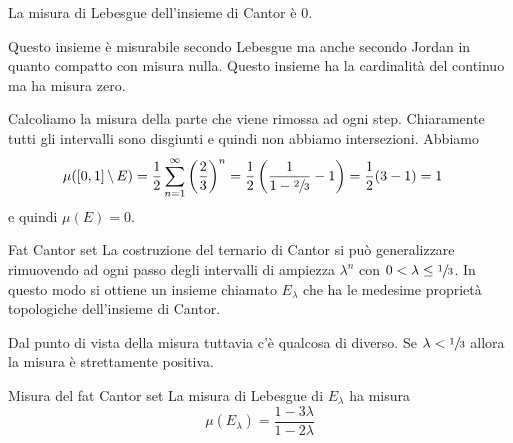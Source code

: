 \documentclass[a4paper]{article}
\begin{document}
\begin{radioactive}
\begin{snippetproposition}{}
    La misura di Lebesgue dell'insieme di Cantor è \(0\).
\end{snippetproposition}
\end{radioactive}

\begin{radioactive}
Questo insieme è misurabile secondo Lebesgue ma anche secondo Jordan in quanto compatto
con misura nulla. Questo insieme ha la cardinalità del continuo ma ha misura zero.
\end{radioactive}

\begin{radioactive}
\begin{snippetproof}{}
    Calcoliamo la misura della parte che viene rimossa ad ogni step.
    Chiaramente tutti gli intervalli sono disgiunti e quindi non abbiamo intersezioni.
    Abbiamo
    \begin{align*}
        \mu([0,1] \,\backslash\, E)
        &= \frac12\sum_{n=1}^\infty\left(\frac23\right)^n
        = \frac12 \left(\frac{1}{1 - \sfrac23} - 1\right)
        = \frac12(3-1) = 1
    \end{align*}
    e quindi \(\mu(E) = 0\).
\end{snippetproof}
\end{radioactive}

\begin{radioactive}
\begin{snippetdefinition}{Fat Cantor set}
    La costruzione del ternario di Cantor si può generalizzare
    rimuovendo ad ogni passo degli intervalli
    di ampiezza \(\lambda^n\) con \(0 < \lambda \leq \sfrac13\).
    In questo modo si ottiene un insieme chiamato
    \(E_\lambda\) che ha le medesime proprietà topologiche dell'insieme di Cantor.
\end{snippetdefinition}
\end{radioactive}

\begin{radioactive}
Dal punto di vista della misura tuttavia c'è qualcosa di diverso.
Se \(\lambda < \sfrac13\) allora la misura è strettamente positiva.
\end{radioactive}

\begin{radioactive}
\begin{snippetproposition}{Misura del fat Cantor set}
    La misura di Lebesgue di \(E_\lambda\) ha misura
    \[
        \mu(E_\lambda) = \frac{1-3\lambda}{1-2\lambda}
    \]
\end{snippetproposition}
\end{radioactive}
\end{document}
